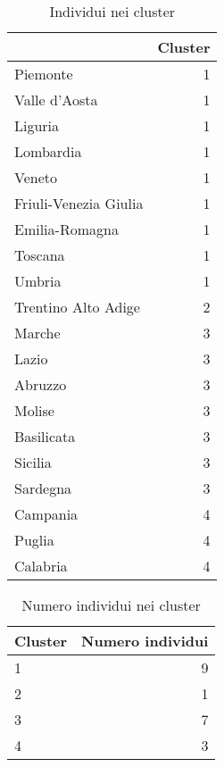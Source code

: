 \documentclass[]{book}
\begin{document}
\begin{table}

\caption{\label{tab:individui-cluster}Individui nei cluster}
\centering
\begin{tabular}[t]{l|r}
\hline
  & Cluster\\
\hline
Piemonte & 1\\
\hline
Valle d'Aosta & 1\\
\hline
Liguria & 1\\
\hline
Lombardia & 1\\
\hline
Veneto & 1\\
\hline
Friuli-Venezia Giulia & 1\\
\hline
Emilia-Romagna & 1\\
\hline
Toscana & 1\\
\hline
Umbria & 1\\
\hline
Trentino Alto Adige & 2\\
\hline
Marche & 3\\
\hline
Lazio & 3\\
\hline
Abruzzo & 3\\
\hline
Molise & 3\\
\hline
Basilicata & 3\\
\hline
Sicilia & 3\\
\hline
Sardegna & 3\\
\hline
Campania & 4\\
\hline
Puglia & 4\\
\hline
Calabria & 4\\
\hline
\end{tabular}
\end{table}

\begin{table}

\caption{\label{tab:numero-individui-cluster}Numero individui nei cluster}
\centering
\begin{tabular}[t]{l|r}
\hline
Cluster & Numero individui\\
\hline
1 & 9\\
\hline
2 & 1\\
\hline
3 & 7\\
\hline
4 & 3\\
\hline
\end{tabular}
\end{table}
\end{document}
